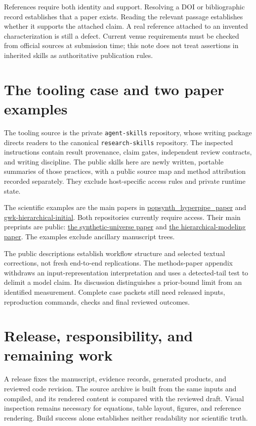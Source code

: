 \documentclass{article}
\begin{document}
References require both identity and support. Resolving a DOI or bibliographic record establishes that a paper exists. Reading the relevant passage establishes whether it supports the attached claim. A real reference attached to an invented characterization is still a defect. Current venue requirements must be checked from official sources at submission time; this note does not treat assertions in inherited skills as authoritative publication rules.

\section{The tooling case and two paper examples}
The tooling source is the private \texttt{agent-skills} repository, whose writing package directs readers to the canonical \texttt{research-skills} repository. The inspected instructions contain result provenance, claim gates, independent review contracts, and writing discipline. The public skills here are newly written, portable summaries of those practices, with a public source map and method attribution recorded separately. They exclude host-specific access rules and private runtime state.

The scientific examples are the main papers in \href{https://github.com/oshaughnessy-junior/popsynth_hyperpipe_paper}{popsynth\_hyperpipe\_paper} and \href{https://github.com/oshaughnessy-junior/gwk-hierarchical-initial}{gwk-hierarchical-initial}. Both repositories currently require access. Their main preprints are public: \href{https://arxiv.org/abs/2609.05996}{the synthetic-universe paper} and \href{https://arxiv.org/abs/2609.06728}{the hierarchical-modeling paper}. The examples exclude ancillary manuscript trees.

The public descriptions establish workflow structure and selected textual corrections, not fresh end-to-end replications. The methods-paper appendix withdraws an input-representation interpretation and uses a detected-tail test to delimit a model claim. Its discussion distinguishes a prior-bound limit from an identified measurement. Complete case packets still need released inputs, reproduction commands, checks and final reviewed outcomes.

\section{Release, responsibility, and remaining work}
A release fixes the manuscript, evidence records, generated products, and reviewed code revision. The source archive is built from the same inputs and compiled, and its rendered content is compared with the reviewed draft. Visual inspection remains necessary for equations, table layout, figures, and reference rendering. Build success alone establishes neither readability nor scientific truth.
\end{document}
